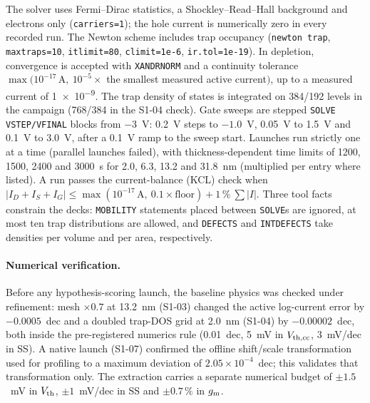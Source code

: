 The solver uses Fermi--Dirac statistics, a Shockley--Read--Hall background and electrons only
(\texttt{carriers=1}); the hole current is numerically zero in every recorded run. %
The Newton scheme includes trap occupancy (\texttt{newton trap}, \texttt{maxtraps=10}, \texttt{itlimit=80},
\texttt{climit=1e-6}, \texttt{ir.tol=1e-19}). %
In depletion, convergence is accepted with \texttt{XANDRNORM} and a continuity tolerance
$\max(10^{-17}\,\mathrm{A},\ 10^{-5}\times$ the smallest measured active current$)$, up to a measured current of
\SI{1e-9}{\Aum}. %
The trap density of states is integrated on 384/192 levels in the campaign (768/384 in the S1-04 check). %
Gate sweeps are stepped \texttt{SOLVE VSTEP/VFINAL} blocks from $-3$~V: \SI{0.2}{V} steps to $-1.0$~V,
\SI{0.05}{V} to \SI{1.5}{V} and \SI{0.1}{V} to \SI{3.0}{V}, after a \SI{0.1}{V} ramp to the sweep start. %
Launches run strictly one at a time (parallel launches failed), with thickness-dependent time limits of 1200, 1500,
2400 and \SI{3000}{s} for 2.0, 6.3, 13.2 and \SI{31.8}{nm} (multiplied per entry where listed). %
A run passes the current-balance (KCL) check when
$|I_D + I_S + I_G| \le \max(10^{-17}\,\mathrm{A},\ 0.1\times\mathrm{floor}) + 1\,\%\ \sum|I|$. %
Three tool facts constrain the decks: \texttt{MOBILITY} statements placed between \texttt{SOLVE}s are ignored, at most
ten trap distributions are allowed, and \texttt{DEFECTS} and \texttt{INTDEFECTS} take densities per volume and per
area, respectively. %

\paragraph{Numerical verification.} Before any hypothesis-scoring launch, the baseline physics was checked under
refinement: mesh $\times0.7$ at \SI{13.2}{nm} (S1-03) changed the active log-current error by $-0.0005$~dec and a
doubled trap-DOS grid at \SI{2.0}{nm} (S1-04) by $-0.00002$~dec, both inside the pre-registered numerics rule
(\SI{0.01}{dec}, \SI{5}{mV} in $V_{\mathrm{th,cc}}$, \SI{3}{mV/dec} in SS). %
A native launch (S1-07) confirmed the offline shift/scale transformation used for profiling to a maximum deviation of
$2.05\times10^{-4}$~dec; this validates that transformation only. %
The extraction carries a separate numerical budget of $\pm1.5$~mV in $V_{\mathrm{th}}$, $\pm1$~mV/dec in SS and $\pm0.7\,\%$ in
$g_{\mathrm{m}}$. %

